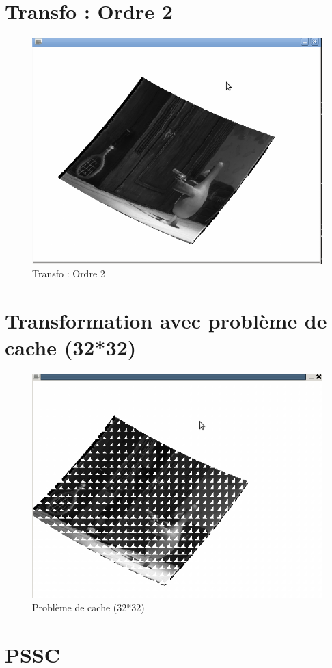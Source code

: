 \documentclass{beamer}
\begin{document}
\section{Transfo : Ordre 2}
\begin{frame}
\begin{figure}[!h]
\centering
\includegraphics[scale = 0.3]{Transfo_ordre_2.png}
\caption{Transfo : Ordre 2}
\end{figure}
\end{frame}

\section{Transformation avec problème de cache (32*32)}
\begin{frame}
\begin{figure}[!h]
\centering
\includegraphics[scale = 0.3]{transfo_pb_cache.png}
\caption{Problème de cache (32*32)}
\end{figure}
\end{frame}

\section{PSSC}
\end{document}
